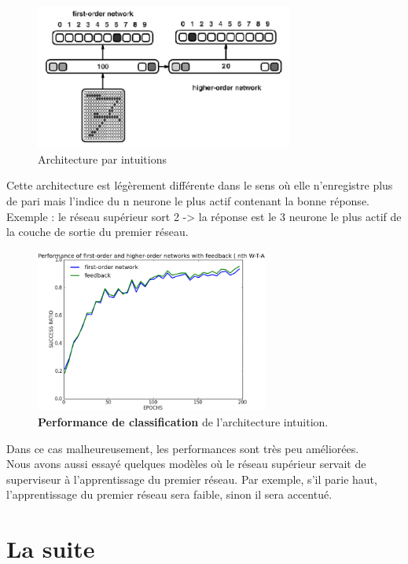 \documentclass[a4paper,12pt, twoside]{article}
\begin{document}
\begin{figure}[H]
 \begin{center}
 \includegraphics[width=320px]{../pre-presentation/nth_wta.png}
\end{center}
\caption{Architecture par intuitions}
\end{figure}

Cette architecture est légèrement différente dans le sens où elle n'enregistre
plus de pari mais l'indice du n neurone le plus actif contenant la bonne réponse.
Exemple : le réseau supérieur sort 2 -> la réponse est le 3 neurone le plus actif 
de la couche de sortie du premier réseau.
\newline

\begin{figure}[H]
 \begin{center}
 \includegraphics[width=290px]{nth_wta.png}
\end{center}
\caption{\textbf{Performance de classification} de l'architecture intuition.}
\end{figure}

Dans ce cas malheureusement, les performances sont très peu améliorées.
\\[0.7cm]

Nous avons aussi essayé quelques modèles où le réseau supérieur servait de superviseur
à l'apprentissage du premier réseau. Par exemple, s'il parie haut, l'apprentissage du premier réseau
sera faible, sinon il sera accentué.

\section{La suite}
\end{document}
